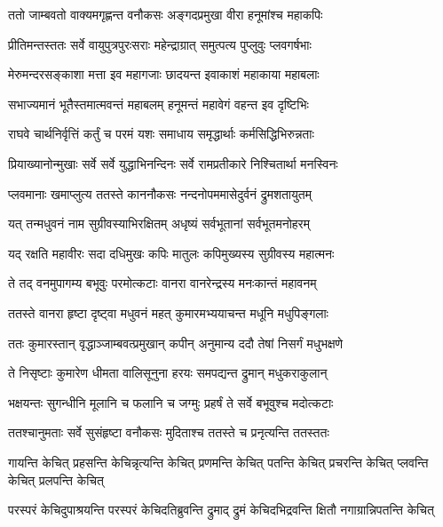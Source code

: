 
\twolineshloka
{ततो जाम्बवतो वाक्यमगृह्णन्त वनौकसः}
{अङ्गदप्रमुखा वीरा हनूमांश्च महाकपिः} %

\twolineshloka
{प्रीतिमन्तस्ततः सर्वे वायुपुत्रपुरःसराः}
{महेन्द्राग्रात् समुत्पत्य पुप्लुवुः प्लवगर्षभाः} %

\twolineshloka
{मेरुमन्दरसङ्काशा मत्ता इव महागजाः}
{छादयन्त इवाकाशं महाकाया महाबलाः} %

\twolineshloka
{सभाज्यमानं भूतैस्तमात्मवन्तं महाबलम्}
{हनूमन्तं महावेगं वहन्त इव दृष्टिभिः} %

\twolineshloka
{राघवे चार्थनिर्वृत्तिं कर्तुं च परमं यशः}
{समाधाय समृद्धार्थाः कर्मसिद्धिभिरुन्नताः} %

\twolineshloka
{प्रियाख्यानोन्मुखाः सर्वे सर्वे युद्धाभिनन्दिनः}
{सर्वे रामप्रतीकारे निश्चितार्था मनस्विनः} %

\twolineshloka
{प्लवमानाः खमाप्लुत्य ततस्ते काननौकसः}
{नन्दनोपममासेदुर्वनं द्रुमशतायुतम्} %

\twolineshloka
{यत् तन्मधुवनं नाम सुग्रीवस्याभिरक्षितम्}
{अधृष्यं सर्वभूतानां सर्वभूतमनोहरम्} %

\twolineshloka
{यद् रक्षति महावीरः सदा दधिमुखः कपिः}
{मातुलः कपिमुख्यस्य सुग्रीवस्य महात्मनः} %

\twolineshloka
{ते तद् वनमुपागम्य बभूवुः परमोत्कटाः}
{वानरा वानरेन्द्रस्य मनःकान्तं महावनम्} %

\twolineshloka
{ततस्ते वानरा हृष्टा दृष्ट्वा मधुवनं महत्}
{कुमारमभ्ययाचन्त मधूनि मधुपिङ्गलाः} %

\twolineshloka
{ततः कुमारस्तान् वृद्धाञ्जाम्बवत्प्रमुखान् कपीन्}
{अनुमान्य ददौ तेषां निसर्गं मधुभक्षणे} %

\twolineshloka
{ते निसृष्टाः कुमारेण धीमता वालिसूनुना}
{हरयः समपद्यन्त द्रुमान् मधुकराकुलान्} %

\twolineshloka
{भक्षयन्तः सुगन्धीनि मूलानि च फलानि च}
{जग्मुः प्रहर्षं ते सर्वे बभूवुश्च मदोत्कटाः} %

\twolineshloka
{ततश्चानुमताः सर्वे सुसंहृष्टा वनौकसः}
{मुदिताश्च ततस्ते च प्रनृत्यन्ति ततस्ततः} %

\twolineshloka
{गायन्ति केचित् प्रहसन्ति केचिन्नृत्यन्ति केचित् प्रणमन्ति केचित्}
{पतन्ति केचित् प्रचरन्ति केचित् प्लवन्ति केचित् प्रलपन्ति केचित्} %

\twolineshloka
{परस्परं केचिदुपाश्रयन्ति परस्परं केचिदतिब्रुवन्ति}
{द्रुमाद् द्रुमं केचिदभिद्रवन्ति क्षितौ नगाग्रान्निपतन्ति केचित्} %

